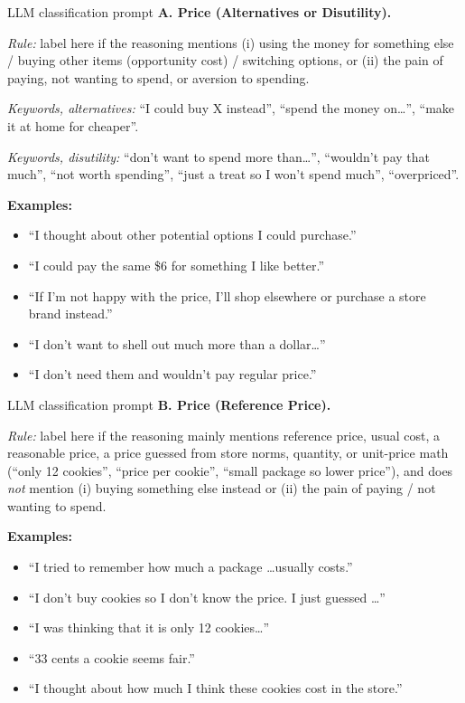 \documentclass[10pt]{beamer}   %
\begin{document}
\begin{frame}{LLM classification prompt}
\small
\textbf{A. Price (Alternatives or Disutility).}

\medskip
\emph{Rule:} label here if the reasoning mentions (i) using the money for something else / buying other items (opportunity cost) / switching options, or (ii) the pain of paying, not wanting to spend, or aversion to spending.

\medskip
\emph{Keywords, alternatives:} ``I could buy X instead'', ``spend the money on\ldots'', ``make it at home for cheaper''.

\medskip
\emph{Keywords, disutility:} ``don't want to spend more than\ldots'', ``wouldn't pay that much'', ``not worth spending'', ``just a treat so I won't spend much'', ``overpriced''.

\medskip
\textbf{Examples:}
\begin{itemize}
\item ``I thought about other potential options I could purchase.''
\item ``I could pay the same \$6 for something I like better.''
\item ``If I'm not happy with the price, I'll shop elsewhere or purchase a store brand instead.''
\item ``I don't want to shell out much more than a dollar\ldots''
\item ``I don't need them and wouldn't pay regular price.''
\end{itemize}
\end{frame}

\begin{frame}{LLM classification prompt}
\small
\textbf{B. Price (Reference Price).}

\emph{Rule:} label here if the reasoning mainly mentions reference price, usual cost, a reasonable price, a price guessed from store norms, quantity, or unit-price math (``only 12 cookies'', ``price per cookie'', ``small package so lower price''), and does \emph{not} mention (i) buying something else instead or (ii) the pain of paying / not wanting to spend.
\medskip

\textbf{Examples:}
\begin{itemize}
\item ``I tried to remember how much a package \ldots usually costs.''
\item ``I don't buy cookies so I don't know the price. I just guessed \ldots''
\item ``I was thinking that it is only 12 cookies\ldots''
\item ``33 cents a cookie seems fair.''
\item ``I thought about how much I think these cookies cost in the store.''
\end{itemize}
\end{frame}
\end{document}
